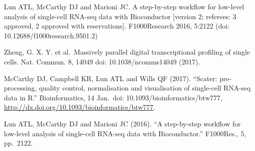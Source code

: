 \documentclass[]{article}
\begin{document}
Lun ATL, McCarthy DJ and Marioni JC. A step-by-step workflow for
low-level analysis of single-cell RNA-seq data with Bioconductor
{[}version 2; referees: 3 approved, 2 approved with reservations{]}.
F1000Research 2016, 5:2122 (doi: 10.12688/f1000research.9501.2)

Zheng, G. X. Y. et al.~Massively parallel digital transcriptional
profiling of single cells. Nat. Commun. 8, 14049 doi:
10.1038/ncomms14049 (2017).

McCarthy DJ, Campbell KR, Lun ATL and Wills QF (2017). ``Scater:
pre-processing, quality control, normalisation and visualisation of
single-cell RNA-seq data in R.'' Bioinformatics, 14 Jan.~doi:
10.1093/bioinformatics/btw777,
\url{http://dx.doi.org/10.1093/bioinformatics/btw777}.

Lun ATL, McCarthy DJ and Marioni JC (2016). ``A step-by-step workflow
for low-level analysis of single-cell RNA-seq data with Bioconductor.''
F1000Res., 5, pp.~2122.
\end{document}
